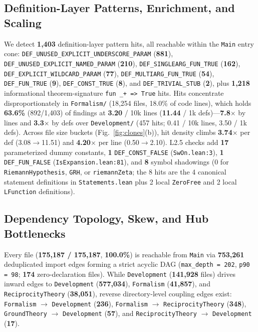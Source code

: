 \documentclass[10pt,twocolumn]{article}
\newcommand{\ub}{\_\allowbreak}
\begin{document}
\subsection{Definition-Layer Patterns, Enrichment, and Scaling}
We detect \textbf{1,403} definition-layer pattern hits, all reachable within the \texttt{Main} entry cone: \texttt{DEF\ub UNUSED\ub EXPLICIT\ub UNDERSCORE\ub PARAM} (\textbf{881}), \texttt{DEF\ub UNUSED\ub EXPLICIT\ub NAMED\ub PARAM} (\textbf{210}), \texttt{DEF\ub SINGLEARG\ub FUN\ub TRUE} (\textbf{162}), \texttt{DEF\ub EXPLICIT\ub WILDCARD\ub PARAM} (\textbf{77}), \texttt{DEF\ub MULTIARG\ub FUN\ub TRUE} (\textbf{54}), \texttt{DEF\ub FUN\ub TRUE} (\textbf{9}), \texttt{DEF\ub CONST\ub TRUE} (\textbf{8}), and \texttt{DEF\ub TRIVIAL\ub STUB} (\textbf{2}), plus \textbf{1,218} informational theorem-signature \texttt{fun \_+ => True} hits. Hits concentrate disproportionately in \texttt{Formalism/} (18,254 files, 18.0\% of code lines), which holds \textbf{63.6\%} (892/1,403) of findings at \textbf{3.20} / 10k lines (\textbf{11.44} / 1k defs)---\textbf{7.8$\times$} by lines and \textbf{3.3$\times$} by defs over \texttt{Development/} (457 hits; 0.41 / 10k lines, 3.50 / 1k defs). Across file size buckets (Fig.~\ref{fig:clones}(b)), hit density climbs \textbf{3.74$\times$} per def (3.08$\to$11.51) and \textbf{4.20$\times$} per line (0.50$\to$2.10). L2.5 checks add \textbf{17} parameterized dummy constants, \textbf{1} \texttt{DEF\ub CONST\ub FALSE} (\texttt{SwOn.lean:3}), \textbf{1} \texttt{DEF\ub FUN\ub FALSE} (\texttt{IsExpansion.lean:81}), and \textbf{8} symbol shadowings (0 for \texttt{RiemannHypothesis}, \texttt{GRH}, or \texttt{riemannZeta}; the 8 hits are the 4 canonical statement definitions in \texttt{Statements.lean} plus 2 local \texttt{ZeroFree} and 2 local \texttt{LFunction} definitions).

\subsection{Dependency Topology, Skew, and Hub Bottlenecks}
Every file (\textbf{175,187 / 175,187}, \textbf{100.0\%}) is reachable from \texttt{Main} via \textbf{753,261} deduplicated import edges forming a strict acyclic DAG (\texttt{max\ub depth = 202}, \texttt{p90 = 98}; \textbf{174} zero-declaration files). While \texttt{Development} (\textbf{141,928} files) drives inward edges to \texttt{Development} (\textbf{577,034}), \texttt{Formalism} (\textbf{41,857}), and \texttt{ReciprocityTheory} (\textbf{38,051}), reverse directory-level coupling edges exist: \texttt{Formalism} $\to$ \texttt{Development} (\textbf{236}), \texttt{Formalism} $\to$ \texttt{ReciprocityTheory} (\textbf{348}), \texttt{GroundTheory} $\to$ \texttt{Development} (\textbf{57}), and \texttt{ReciprocityTheory} $\to$ \texttt{Development} (\textbf{17}).
\end{document}
